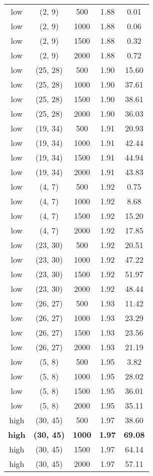 \begin{tabular}{c c c c c}
low & (2, 9) &  500 & 1.88 & 0.01 \\
low & (2, 9) &  1000 & 1.88 & 0.06 \\
low & (2, 9) &  1500 & 1.88 & 0.32 \\
low & (2, 9) &  2000 & 1.88 & 0.72 \\
low & (25, 28) &  500 & 1.90 & 15.60 \\
low & (25, 28) &  1000 & 1.90 & 37.61 \\
low & (25, 28) &  1500 & 1.90 & 38.61 \\
low & (25, 28) &  2000 & 1.90 & 36.03 \\
low & (19, 34) &  500 & 1.91 & 20.93 \\
low & (19, 34) &  1000 & 1.91 & 42.44 \\
low & (19, 34) &  1500 & 1.91 & 44.94 \\
low & (19, 34) &  2000 & 1.91 & 43.83 \\
low & (4, 7) &  500 & 1.92 & 0.75 \\
low & (4, 7) &  1000 & 1.92 & 8.68 \\
low & (4, 7) &  1500 & 1.92 & 15.20 \\
low & (4, 7) &  2000 & 1.92 & 17.85 \\
low & (23, 30) &  500 & 1.92 & 20.51 \\
low & (23, 30) &  1000 & 1.92 & 47.22 \\
low & (23, 30) &  1500 & 1.92 & 51.97 \\
low & (23, 30) &  2000 & 1.92 & 48.44 \\
low & (26, 27) &  500 & 1.93 & 11.42 \\
low & (26, 27) &  1000 & 1.93 & 23.29 \\
low & (26, 27) &  1500 & 1.93 & 23.56 \\
low & (26, 27) &  2000 & 1.93 & 21.19 \\
low & (5, 8) &  500 & 1.95 & 3.82 \\
low & (5, 8) &  1000 & 1.95 & 28.02 \\
low & (5, 8) &  1500 & 1.95 & 36.01 \\
low & (5, 8) &  2000 & 1.95 & 35.11 \\
high & (30, 45) &  500 & 1.97 & 38.60 \\
\textbf{high} & \textbf{(30, 45)} & \textbf{ 1000} & \textbf{1.97} & \textbf{69.08} \\
high & (30, 45) &  1500 & 1.97 & 64.14 \\
high & (30, 45) &  2000 & 1.97 & 57.11 \\

\end{tabular}
